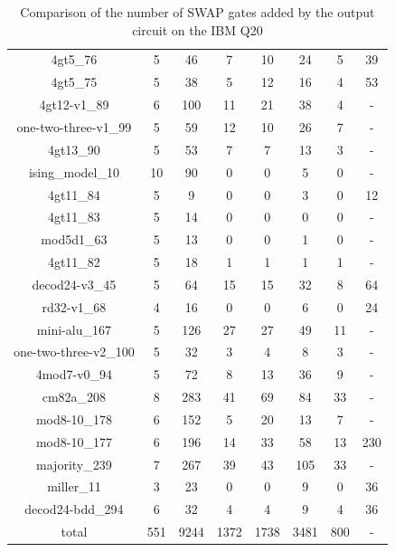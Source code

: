 \documentclass[runningheads]{llncs}
\begin{document}
\begin{table}[H]
\begin{center}
\begin{tabular}{|c|c|c|c|c|c|c|c|}
4gt5\_76 & 5 & 46 & 7 & 10 & 24 & 5&39 \\
4gt5\_75 & 5 & 38 & 5 & 12 & 16 & 4& 53 \\
4gt12-v1\_89 & 6 & 100 & 11 & 21 & 38 & 4& - \\
one-two-three-v1\_99 & 5 & 59 & 12 & 10 & 26 & 7& - \\
4gt13\_90 & 5 & 53 & 7 & 7 & 13 & 3& - \\
ising\_model\_10 & 10 & 90 & 0 & 0 & 5 & 0& - \\
4gt11\_84 & 5 & 9 & 0 & 0 & 3 & 0& 12\\
4gt11\_83 & 5 & 14 & 0 & 0 & 0 & 0& - \\
mod5d1\_63 & 5 & 13 & 0 & 0 & 1 & 0& - \\
4gt11\_82 & 5 & 18 & 1 & 1 & 1 & 1& - \\
decod24-v3\_45 & 5 & 64 & 15 & 15 & 32 & 8& 64 \\
rd32-v1\_68 & 4 & 16 & 0 & 0 & 6 & 0& 24 \\
mini-alu\_167 & 5 & 126 & 27 & 27 & 49 & 11& - \\
one-two-three-v2\_100 & 5 & 32 & 3 & 4 & 8 & 3& - \\
4mod7-v0\_94 & 5 & 72 & 8 & 13 & 36 & 9& - \\
cm82a\_208 & 8 & 283 & 41 & 69 & 84 & 33& - \\
mod8-10\_178 & 6 & 152 & 5 & 20 & 13 & 7& - \\
mod8-10\_177 & 6 & 196 & 14 & 33 & 58 & 13& 230 \\
majority\_239 & 7 & 267 & 39 & 43 & 105 & 33& - \\
miller\_11 & 3 & 23 & 0 & 0 & 9 & 0& 36 \\
decod24-bdd\_294 & 6 & 32 & 4 & 4 & 9 & 4& 36 \\
\hline
total & 551 & 9244 & 1372 & 1738 & 3481 & 800 &-\\
		\hline
		\end{tabular} 
		\end{center} 
		\caption{Comparison of the number of SWAP gates added by the 
		output circuit on the IBM Q20 } 
		\label{tab3}
		\end{table}	
\end{document}
